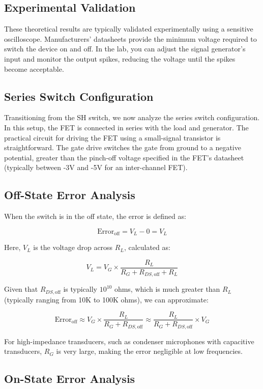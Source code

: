 \subsection{Experimental Validation}

These theoretical results are typically validated experimentally using a sensitive oscilloscope. Manufacturers' datasheets provide the minimum voltage required to switch the device on and off. In the lab, you can adjust the signal generator's input and monitor the output spikes, reducing the voltage until the spikes become acceptable.

\subsection{Series Switch Configuration}

Transitioning from the SH switch, we now analyze the series switch configuration. In this setup, the FET is connected in series with the load and generator. The practical circuit for driving the FET using a small-signal transistor is straightforward. The gate drive switches the gate from ground to a negative potential, greater than the pinch-off voltage specified in the FET's datasheet (typically between -3V and -5V for an inter-channel FET).

\subsection{Off-State Error Analysis}

When the switch is in the off state, the error is defined as:

\[
\text{Error}_{\text{off}} = V_L - 0 = V_L
\]

Here, \( V_L \) is the voltage drop across \( R_L \), calculated as:

\[
V_L = V_G \times \frac{R_L}{R_G + R_{DS,\text{off}} + R_L}
\]

Given that \( R_{DS,\text{off}} \) is typically \( 10^{10} \) ohms, which is much greater than \( R_L \) (typically ranging from 10K to 100K ohms), we can approximate:

\[
\text{Error}_{\text{off}} \approx V_G \times \frac{R_L}{R_G + R_{DS,\text{off}}} \approx \frac{R_L}{R_G + R_{DS,\text{off}}} \times V_G
\]

For high-impedance transducers, such as condenser microphones with capacitive transducers, \( R_G \) is very large, making the error negligible at low frequencies.

\subsection{On-State Error Analysis}


